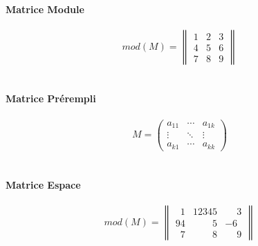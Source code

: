 \documentclass{article}
\begin{document}
\textbf{Matrice Module} \\ \\
$$mod(M)=\begin{Vmatrix}
1 & 2 & 3 \\
4 & 5 & 6 \\
7 & 8 & 9
\end{Vmatrix}$$ \\ \\
\textbf{Matrice Prérempli} \\ \\
$$M=\begin{pmatrix}
a_{11} & \cdots & a_{1k} \\
\vdots & \ddots &\vdots \\
a_{k1} & \cdots & a_{kk}
\end{pmatrix}$$ \\ \\
\textbf{Matrice Espace} \\ \\
$$mod(M)=\begin{Vmatrix}
\phantom{9}1 & 12345 & \phantom{-}3 \\
94 & \phantom{1234}5 & -6 \\
\phantom{9}7 & \phantom{1234}8 & \phantom{-}9
\end{Vmatrix}$$ \\ \\
\end{document}
